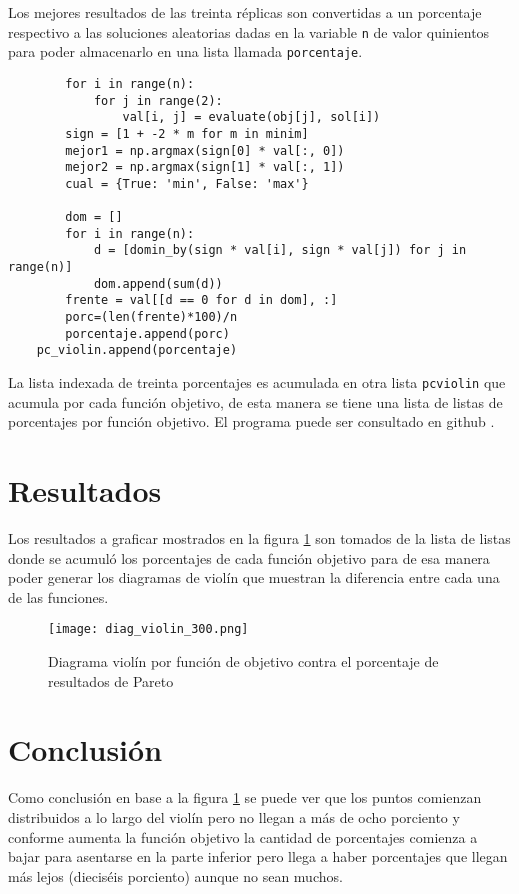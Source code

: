 \documentclass[a4paper, 11pt]{article}
\begin{document}
Los mejores resultados de las treinta réplicas son convertidas a un porcentaje respectivo a las soluciones aleatorias dadas en la variable \texttt{n} de valor quinientos para poder almacenarlo en una lista llamada \texttt{porcentaje}.


\begin{verbatim}
        for i in range(n): 
            for j in range(2):
                val[i, j] = evaluate(obj[j], sol[i])
        sign = [1 + -2 * m for m in minim]
        mejor1 = np.argmax(sign[0] * val[:, 0])
        mejor2 = np.argmax(sign[1] * val[:, 1])
        cual = {True: 'min', False: 'max'}

        dom = []
        for i in range(n):
            d = [domin_by(sign * val[i], sign * val[j]) for j in range(n)]  
            dom.append(sum(d))
        frente = val[[d == 0 for d in dom], :]
        porc=(len(frente)*100)/n
        porcentaje.append(porc)
    pc_violin.append(porcentaje)
\end{verbatim}

La lista indexada de treinta porcentajes es acumulada en otra lista \texttt{pcviolin} que acumula por cada función objetivo, de esta manera se tiene una lista de listas de porcentajes por función objetivo. El programa puede ser consultado en github \cite{Edson}.

\section{Resultados}
Los resultados a graficar mostrados en la figura \ref{f1} son tomados de la lista de listas donde se acumuló los porcentajes de cada función objetivo para de esa manera poder generar los diagramas de violín que muestran la diferencia entre cada una de las funciones.


\begin{figure}[H]
  \centering      
  \texttt{[image: diag\_violin\_300.png]}
  \caption{Diagrama violín por función de objetivo contra el porcentaje de resultados de Pareto}
  \label{f1}
\end{figure}
\bigskip

\section{Conclusión}
Como conclusión en base a la figura \ref{f1} se puede ver que los puntos comienzan distribuidos a lo largo del violín pero no llegan a más de ocho porciento y conforme aumenta la función objetivo la cantidad de porcentajes comienza a bajar para asentarse en la parte inferior pero llega a haber porcentajes que llegan más lejos (dieciséis porciento) aunque no sean muchos. 



\end{document}
